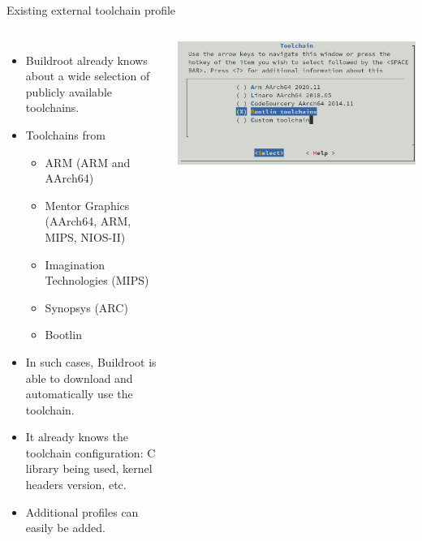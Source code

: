 \begin{frame}{Existing external toolchain profile}
  \begin{columns}
    \begin{itemize}
    \item Buildroot already knows about a wide selection of publicly
      available toolchains.
    \item Toolchains from
      \begin{itemize}
      \item ARM (ARM and AArch64)
      \item Mentor Graphics (AArch64, ARM, MIPS, NIOS-II)
      \item Imagination Technologies (MIPS)
      \item Synopsys (ARC)
      \item Bootlin
      \end{itemize}
    \item In such cases, Buildroot is able to download and automatically
      use the toolchain.
    \item It already knows the toolchain configuration: C library being
      used, kernel headers version, etc.
    \item Additional profiles can easily be added.
    \end{itemize}
    \includegraphics[width=\textwidth]{slides/buildroot-toolchain/external-toolchain-profiles.png}
  \end{columns}
\end{frame}


